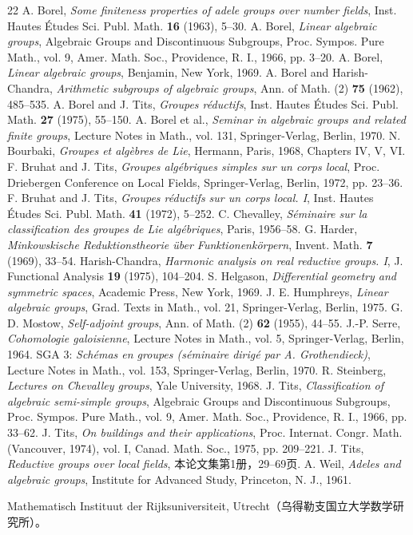 \begin{thebibliography}{22}
 A. Borel, \textit{Some finiteness properties of adele groups over number fields}, Inst. Hautes Études Sci. Publ. Math. \textbf{16} (1963), 5--30.
 A. Borel, \textit{Linear algebraic groups}, Algebraic Groups and Discontinuous Subgroups, Proc. Sympos. Pure Math., vol. 9, Amer. Math. Soc., Providence, R. I., 1966, pp. 3--20.
 A. Borel, \textit{Linear algebraic groups}, Benjamin, New York, 1969.
 A. Borel and Harish-Chandra, \textit{Arithmetic subgroups of algebraic groups}, Ann. of Math. (2) \textbf{75} (1962), 485--535.
 A. Borel and J. Tits, \textit{Groupes réductifs}, Inst. Hautes Études Sci. Publ. Math. \textbf{27} (1975), 55--150.
 A. Borel et al., \textit{Seminar in algebraic groups and related finite groups}, Lecture Notes in Math., vol. 131, Springer-Verlag, Berlin, 1970.
 N. Bourbaki, \textit{Groupes et algèbres de Lie}, Hermann, Paris, 1968, Chapters IV, V, VI.
 F. Bruhat and J. Tits, \textit{Groupes algébriques simples sur un corps local}, Proc. Driebergen Conference on Local Fields, Springer-Verlag, Berlin, 1972, pp. 23--36.
 F. Bruhat and J. Tits, \textit{Groupes réductifs sur un corps local. I}, Inst. Hautes Études Sci. Publ. Math. \textbf{41} (1972), 5--252.
 C. Chevalley, \textit{Séminaire sur la classification des groupes de Lie algébriques}, Paris, 1956--58.
 G. Harder, \textit{Minkowskische Reduktionstheorie über Funktionenkörpern}, Invent. Math. \textbf{7} (1969), 33--54.
 Harish-Chandra, \textit{Harmonic analysis on real reductive groups. I}, J. Functional Analysis \textbf{19} (1975), 104--204.
 S. Helgason, \textit{Differential geometry and symmetric spaces}, Academic Press, New York, 1969.
 J. E. Humphreys, \textit{Linear algebraic groups}, Grad. Texts in Math., vol. 21, Springer-Verlag, Berlin, 1975.
 G. D. Mostow, \textit{Self-adjoint groups}, Ann. of Math. (2) \textbf{62} (1955), 44--55.
 J.-P. Serre, \textit{Cohomologie galoisienne}, Lecture Notes in Math., vol. 5, Springer-Verlag, Berlin, 1964.
 SGA 3: \textit{Schémas en groupes (séminaire dirigé par A. Grothendieck)}, Lecture Notes in Math., vol. 153, Springer-Verlag, Berlin, 1970.
 R. Steinberg, \textit{Lectures on Chevalley groups}, Yale University, 1968.
 J. Tits, \textit{Classification of algebraic semi-simple groups}, Algebraic Groups and Discontinuous Subgroups, Proc. Sympos. Pure Math., vol. 9, Amer. Math. Soc., Providence, R. I., 1966, pp. 33--62.
 J. Tits, \textit{On buildings and their applications}, Proc. Internat. Congr. Math. (Vancouver, 1974), vol. I, Canad. Math. Soc., 1975, pp. 209--221.
 J. Tits, \textit{Reductive groups over local fields}, 本论文集第1册，29--69页.
 A. Weil, \textit{Adeles and algebraic groups}, Institute for Advanced Study, Princeton, N. J., 1961.
\end{thebibliography}
\noindent Mathematisch Instituut der Rijksuniversiteit, Utrecht（乌得勒支国立大学数学研究所）。
